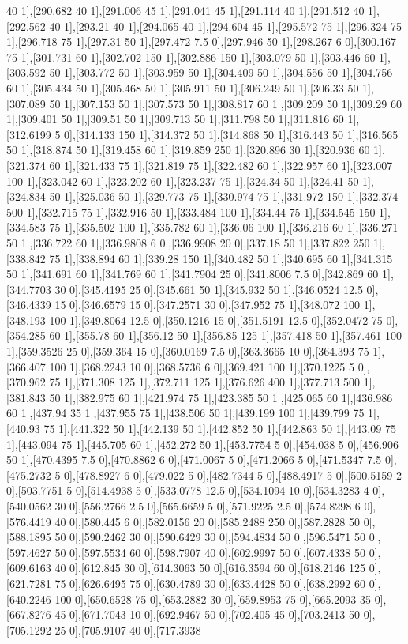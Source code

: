 {40 1],[290.682 40 1],[291.006 45 1],[291.041 45 1],[291.114 40 1],[291.512 40 1],[292.562 40 1],[293.21 40 1],[294.065 40 1],[294.604 45 1],[295.572 75 1],[296.324 75 1],[296.718 75 1],[297.31 50 1],[297.472 7.5 0],[297.946 50 1],[298.267 6 0],[300.167 75 1],[301.731 60 1],[302.702 150 1],[302.886 150 1],[303.079 50 1],[303.446 60 1],[303.592 50 1],[303.772 50 1],[303.959 50 1],[304.409 50 1],[304.556 50 1],[304.756 60 1],[305.434 50 1],[305.468 50 1],[305.911 50 1],[306.249 50 1],[306.33 50 1],[307.089 50 1],[307.153 50 1],[307.573 50 1],[308.817 60 1],[309.209 50 1],[309.29 60 1],[309.401 50 1],[309.51 50 1],[309.713 50 1],[311.798 50 1],[311.816 60 1],[312.6199 5 0],[314.133 150 1],[314.372 50 1],[314.868 50 1],[316.443 50 1],[316.565 50 1],[318.874 50 1],[319.458 60 1],[319.859 250 1],[320.896 30 1],[320.936 60 1],[321.374 60 1],[321.433 75 1],[321.819 75 1],[322.482 60 1],[322.957 60 1],[323.007 100 1],[323.042 60 1],[323.202 60 1],[323.237 75 1],[324.34 50 1],[324.41 50 1],[324.834 50 1],[325.036 50 1],[329.773 75 1],[330.974 75 1],[331.972 150 1],[332.374 500 1],[332.715 75 1],[332.916 50 1],[333.484 100 1],[334.44 75 1],[334.545 150 1],[334.583 75 1],[335.502 100 1],[335.782 60 1],[336.06 100 1],[336.216 60 1],[336.271 50 1],[336.722 60 1],[336.9808 6 0],[336.9908 20 0],[337.18 50 1],[337.822 250 1],[338.842 75 1],[338.894 60 1],[339.28 150 1],[340.482 50 1],[340.695 60 1],[341.315 50 1],[341.691 60 1],[341.769 60 1],[341.7904 25 0],[341.8006 7.5 0],[342.869 60 1],[344.7703 30 0],[345.4195 25 0],[345.661 50 1],[345.932 50 1],[346.0524 12.5 0],[346.4339 15 0],[346.6579 15 0],[347.2571 30 0],[347.952 75 1],[348.072 100 1],[348.193 100 1],[349.8064 12.5 0],[350.1216 15 0],[351.5191 12.5 0],[352.0472 75 0],[354.285 60 1],[355.78 60 1],[356.12 50 1],[356.85 125 1],[357.418 50 1],[357.461 100 1],[359.3526 25 0],[359.364 15 0],[360.0169 7.5 0],[363.3665 10 0],[364.393 75 1],[366.407 100 1],[368.2243 10 0],[368.5736 6 0],[369.421 100 1],[370.1225 5 0],[370.962 75 1],[371.308 125 1],[372.711 125 1],[376.626 400 1],[377.713 500 1],[381.843 50 1],[382.975 60 1],[421.974 75 1],[423.385 50 1],[425.065 60 1],[436.986 60 1],[437.94 35 1],[437.955 75 1],[438.506 50 1],[439.199 100 1],[439.799 75 1],[440.93 75 1],[441.322 50 1],[442.139 50 1],[442.852 50 1],[442.863 50 1],[443.09 75 1],[443.094 75 1],[445.705 60 1],[452.272 50 1],[453.7754 5 0],[454.038 5 0],[456.906 50 1],[470.4395 7.5 0],[470.8862 6 0],[471.0067 5 0],[471.2066 5 0],[471.5347 7.5 0],[475.2732 5 0],[478.8927 6 0],[479.022 5 0],[482.7344 5 0],[488.4917 5 0],[500.5159 2 0],[503.7751 5 0],[514.4938 5 0],[533.0778 12.5 0],[534.1094 10 0],[534.3283 4 0],[540.0562 30 0],[556.2766 2.5 0],[565.6659 5 0],[571.9225 2.5 0],[574.8298 6 0],[576.4419 40 0],[580.445 6 0],[582.0156 20 0],[585.2488 250 0],[587.2828 50 0],[588.1895 50 0],[590.2462 30 0],[590.6429 30 0],[594.4834 50 0],[596.5471 50 0],[597.4627 50 0],[597.5534 60 0],[598.7907 40 0],[602.9997 50 0],[607.4338 50 0],[609.6163 40 0],[612.845 30 0],[614.3063 50 0],[616.3594 60 0],[618.2146 125 0],[621.7281 75 0],[626.6495 75 0],[630.4789 30 0],[633.4428 50 0],[638.2992 60 0],[640.2246 100 0],[650.6528 75 0],[653.2882 30 0],[659.8953 75 0],[665.2093 35 0],[667.8276 45 0],[671.7043 10 0],[692.9467 50 0],[702.405 45 0],[703.2413 50 0],[705.1292 25 0],[705.9107 40 0],[717.3938 }
